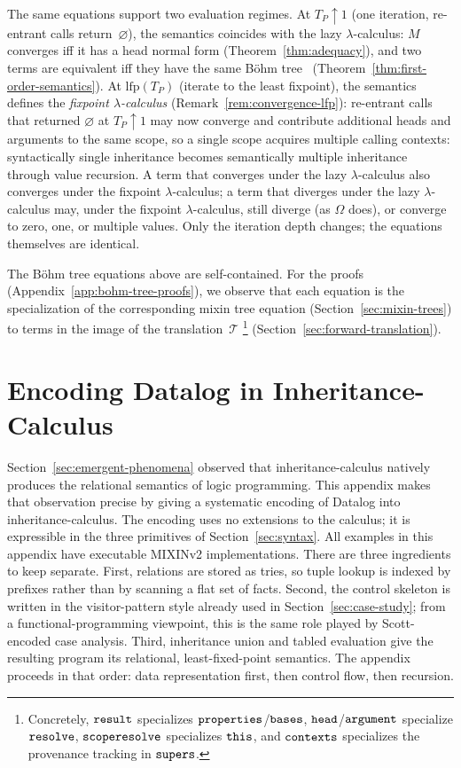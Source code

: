 The same equations support two evaluation regimes.
At $T_P\!\uparrow\!1$ (one iteration, re-entrant calls
return~$\varnothing$), the semantics coincides with the lazy
$\lambda$-calculus:
$M$ converges iff it has a head normal form
(Theorem~\ref{thm:adequacy}), and two terms are
equivalent iff they have the same
B\"ohm tree~\cite{barendregt1984-lambda-calculus}
(Theorem~\ref{thm:first-order-semantics}).
At $\mathrm{lfp}(T_P)$ (iterate to the least fixpoint),
the semantics defines the \emph{fixpoint $\lambda$-calculus}
(Remark~\ref{rem:convergence-lfp}):
re-entrant calls that returned
$\varnothing$ at $T_P\!\uparrow\!1$ may now converge and
contribute additional heads and arguments to the same scope,
so a single scope acquires multiple calling contexts:
syntactically single inheritance becomes semantically
multiple inheritance through value recursion.
A term that converges under the lazy $\lambda$-calculus
also converges under the fixpoint $\lambda$-calculus;
a term that diverges under the lazy $\lambda$-calculus
may, under the fixpoint $\lambda$-calculus, still diverge
(as $\Omega$ does), or converge to zero, one, or
multiple values.
Only the iteration depth changes; the equations themselves
are identical.

The B\"ohm tree equations above are self-contained.
For the proofs (Appendix~\ref{app:bohm-tree-proofs}),
we observe that each equation is the specialization of
the corresponding mixin tree equation
(Section~\ref{sec:mixin-trees}) to terms in the image
of the translation~$\mathcal{T}$%
\footnote{
  Concretely,
  $\mathtt{result}$ specializes $\mathtt{properties}$/$\mathtt{bases}$,
  $\mathtt{head}$/$\mathtt{argument}$ specialize $\mathtt{resolve}$,
  $\mathtt{scoperesolve}$ specializes $\mathtt{this}$,
  and $\mathtt{contexts}$ specializes the provenance tracking
  in $\mathtt{supers}$.
}
(Section~\ref{sec:forward-translation}).

\section{Encoding Datalog in Inheritance-Calculus}
\label{app:datalog-encoding}

Section~\ref{sec:emergent-phenomena} observed that
inheritance-calculus natively produces the relational semantics
of logic programming.
This appendix makes that observation precise by giving a
systematic encoding of Datalog into inheritance-calculus.
The encoding uses no extensions to the calculus; it is
expressible in the three primitives of Section~\ref{sec:syntax}.
All examples in this appendix have executable MIXINv2
implementations.
There are three ingredients to keep separate.
First, relations are stored as tries, so tuple lookup is indexed
by prefixes rather than by scanning a flat set of facts.
Second, the control skeleton is written in the visitor-pattern
style already used in Section~\ref{sec:case-study}; from a
functional-programming viewpoint, this is the same role played by
Scott-encoded case analysis.
Third, inheritance union and tabled evaluation give the resulting
program its relational, least-fixed-point semantics.
The appendix proceeds in that order: data representation first,
then control flow, then recursion.

